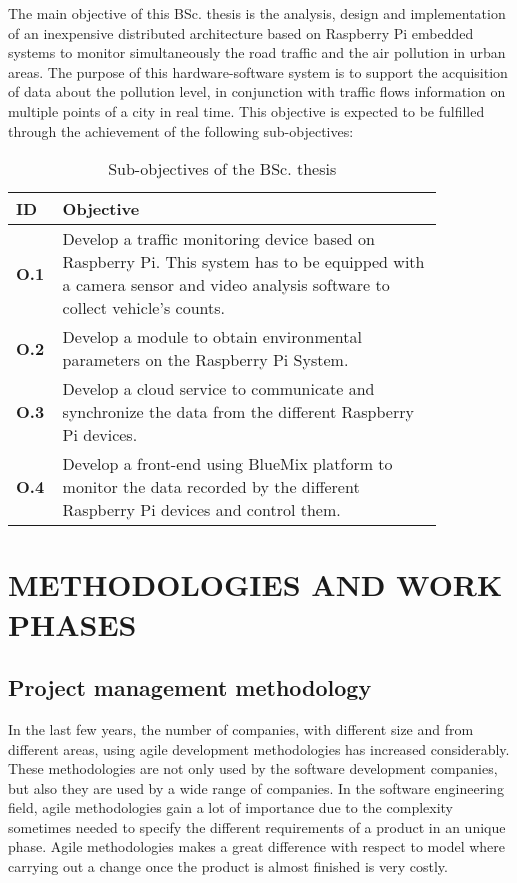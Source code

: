 \documentclass{pre-tfg}
\begin{document}
The main objective of this BSc. thesis is the analysis, design and implementation of an inexpensive distributed architecture based on Raspberry Pi embedded systems to monitor simultaneously the road traffic and the air pollution in urban areas. The purpose of this hardware-software system is to support the acquisition of data about the pollution level, in conjunction with traffic flows information on multiple points of a city in real time. This objective is expected to be fulfilled through the achievement of the following sub-objectives:

\begin{table}[!h]
	\centering
	\caption{Sub-objectives of the BSc. thesis}
	\label{tab:sub-objectives}
	
	\begin{tabular}{m{0.05\linewidth}m{0.8\linewidth}}
		\textbf{ID} & \textbf{Objective} \\
		\hline
		
		\textbf{O.1}& Develop a traffic monitoring device based on Raspberry Pi. This system has to be equipped with a camera sensor and video analysis software to collect vehicle’s counts.  \\
		
		\textbf{O.2}& Develop a module to obtain environmental parameters on the Raspberry Pi System.  \\
		
		\textbf{O.3}& Develop a cloud service to communicate and synchronize the data from the different Raspberry Pi devices.  \\
		
		\textbf{O.4}& Develop a front-end using BlueMix platform to monitor the data recorded by the different Raspberry Pi devices and control them.  \\
		
		\hline
	\end{tabular}
\end{table}


\section{METHODOLOGIES AND WORK PHASES}

\subsection{Project management methodology}
In the last few years, the number of companies, with different size and from different areas, using agile development methodologies has increased considerably. These methodologies are not only used by the software development companies, but also they are used by a wide range of companies. In the software engineering field, agile methodologies gain a lot of importance due to the complexity sometimes needed to specify the different requirements of a product in an unique phase. Agile methodologies makes a great difference with respect to  model where carrying out a change once the product is almost finished is very costly.
\end{document}
